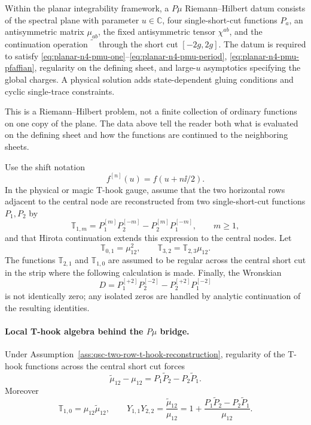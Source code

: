 \begin{definition}
\label{def:planar-n4-qsc-rh-datum}
Within the planar integrability framework, a \(P\mu\) Riemann--Hilbert datum
consists of the spectral plane with parameter \(u\in\mathbb C\), four
single-short-cut functions \(P_a\), an antisymmetric matrix
\(\mu_{ab}\), the fixed antisymmetric tensor \(\chi^{ab}\), and the
continuation operation \(\widetilde{\phantom P}\) through the short cut
\([-2g,2g]\).  The datum is required to satisfy
\eqref{eq:planar-n4-pmu-one}--\eqref{eq:planar-n4-pmu-period},
\eqref{eq:planar-n4-pmu-pfaffian}, regularity on the defining sheet, and
large-\(u\) asymptotics specifying the global charges.  A physical solution
adds state-dependent gluing conditions and cyclic single-trace constraints.
\end{definition}

This is a Riemann--Hilbert problem, not a finite collection of ordinary
functions on one copy of the plane.  The data above tell the reader both what
is evaluated on the defining sheet and how the functions are continued to
the neighboring sheets.

\begin{assumption}
\label{ass:qsc-two-row-t-hook-reconstruction}
Use the shift notation
\[
  f^{[n]}(u)=f(u+n\ii/2).
\]
In the physical or magic T-hook gauge, assume that the two horizontal rows
adjacent to the central node are reconstructed from two single-short-cut
functions \(P_1,P_2\) by
\begin{equation}
  \mathbb T_{1,m}
  =
  P_1^{[m]}P_2^{[-m]}-P_2^{[m]}P_1^{[-m]},
  \qquad m\geq1,
  \label{eq:qsc-two-row-wronskian}
\end{equation}
and that Hirota continuation extends this expression to the central nodes.
Let
\[
  \mathbb T_{0,1}=\mu_{12}^2,\qquad
  \mathbb T_{3,2}=\mathbb T_{2,3}\mu_{12}.
\]
The functions \(\mathbb T_{2,1}\) and \(\mathbb T_{1,0}\) are assumed to be
regular across the central short cut in the strip where the following
calculation is made.  Finally, the Wronskian
\[
  D=P_1^{[+2]}P_2^{[-2]}-P_2^{[+2]}P_1^{[-2]}
\]
is not identically zero; any isolated zeros are handled by analytic
continuation of the resulting identities.
\end{assumption}

\paragraph{Local T-hook algebra behind the \(P\mu\) bridge.}
Under Assumption~\ref{ass:qsc-two-row-t-hook-reconstruction}, regularity of
the T-hook functions across the central short cut forces
\begin{equation}
  \widetilde\mu_{12}-\mu_{12}
  =
  P_1\widetilde P_2-P_2\widetilde P_1.
  \label{eq:qsc-local-mu12-discontinuity}
\end{equation}
Moreover
\begin{equation}
  \mathbb T_{1,0}=\mu_{12}\widetilde\mu_{12},
  \qquad
  Y_{1,1}Y_{2,2}
  =
  \frac{\widetilde\mu_{12}}{\mu_{12}}
  =
  1+
  \frac{P_1\widetilde P_2-P_2\widetilde P_1}{\mu_{12}}.
  \label{eq:qsc-local-y11-y22-bridge}
\end{equation}

